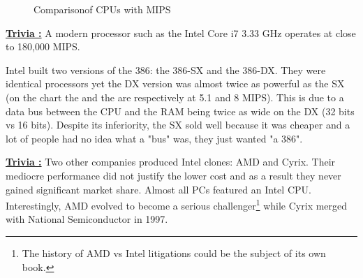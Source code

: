 \documentclass[book.tex]{subfiles}
\begin{document}
\begin{figure}[H]
\centering
   \caption{Comparison\protect\footnotemark of CPUs with MIPS}
 \end{figure}
 \par
 \par
  \textbf{\underline{Trivia :}} A modern processor such as the Intel Core i7 3.33 GHz operates at close to 180,000 MIPS.\\
  \par
 Intel built two versions of the 386: the 386-SX and the 386-DX. They were identical processors yet the DX version was almost twice as powerful as the SX (on the chart the  and the  are respectively at 5.1 and 8 MIPS). This is due to a data bus between the CPU and the RAM being twice as wide on the DX (32 bits vs 16 bits). Despite its inferiority, the SX sold well because it was cheaper and a lot of people had no idea what a "bus" was, they just wanted "a 386".\\



 \par
\textbf{\underline{Trivia :}} Two other companies produced Intel clones: AMD and Cyrix. Their mediocre performance did not justify the lower cost and as a result they never gained significant market share. Almost all PCs featured an Intel CPU. Interestingly, AMD evolved to become a serious challenger\footnote{The history of AMD vs Intel litigations could be the subject of its own book.} while Cyrix merged with National Semiconductor in 1997.\\
\par
\end{document}
